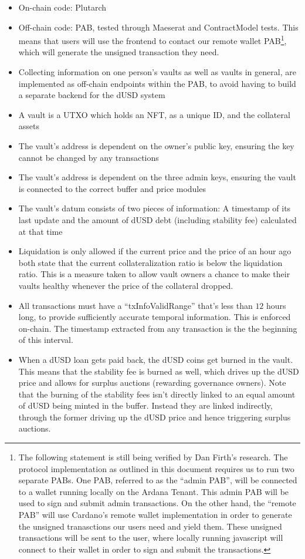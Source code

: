 \documentclass{article} %
\begin{document}
\begin{itemize}
  \item On-chain code: Plutarch
  \item Off-chain code: PAB, tested through Maeserat and ContractModel tests.
    This means that users will use the frontend to contact our remote wallet
    PAB\footnote{
      The following statement is still being verified by Dan Firth's research.
      The protocol implementation as outlined in this document requires us to
      run two separate PABs.
      One PAB, referred to as the ``admin PAB'', will be connected to a wallet
      running locally on the Ardana Tenant.
      This admin PAB will be used to sign and submit admin transactions.
      On the other hand, the ``remote PAB'' will use Cardano's remote wallet
      implementation in order to generate the unsigned tranasctions our users
      need and yield them.
      These unsigned transactions will be sent to the user, where locally
      running javascript will connect to their wallet in order to sign and
      submit the transactions.
    }, which will generate the unsigned transaction they need.
  \item Collecting information on one person's vaults as well as vaults in
    general, are implemented as off-chain endpoints within the PAB, to avoid
    having to build a separate backend for the dUSD system
  \item A vault is a UTXO which holds an NFT, as a unique ID, and the collateral
    assets
  \item The vault's address is dependent on the owner's public key, ensuring the
    key cannot be changed by any transactions
  \item The vault's address is dependent on the three admin keys, ensuring the
    vault is connected to the correct buffer and price modules
  \item The vault's datum consists of two pieces of information: A timestamp of
    its last update and the amount of dUSD debt (including stability fee)
    calculated at that time
  \item Liquidation is only allowed if the current price and the price of an
    hour ago both state that the current collateralization ratio is below the
    liquidation ratio.
    This is a measure taken to allow vault owners a chance to make their vaults
    healthy whenever the price of the collateral dropped.
  \item All transactions must have a ``txInfoValidRange'' that's less than $12$
    hours long, to provide sufficiently accurate temporal information. This is
    enforced on-chain. The timestamp extracted from any transaction is the the
    beginning of this interval.
  \item When a dUSD loan gets paid back, the dUSD coins get burned in the vault.
    This means that the stability fee is burned as well, which drives up the
    dUSD price and allows for surplus auctions (rewarding governance owners).
    Note that the burning of the stability fees isn't directly linked to an
    equal amount of dUSD being minted in the buffer.
    Instead they are linked indirectly, through the former driving up the dUSD
    price and hence triggering surplus auctions.
\end{itemize}
\end{document}
